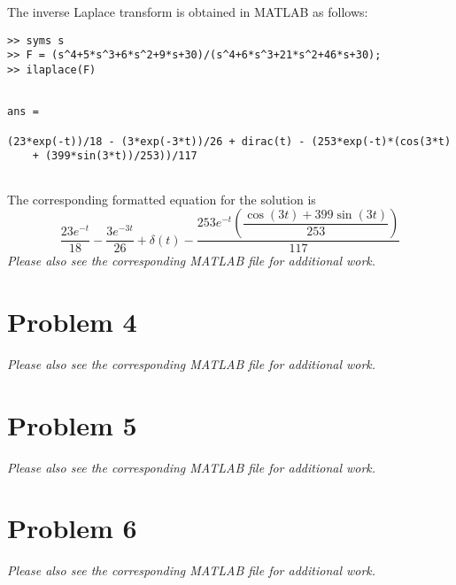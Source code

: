 \documentclass[letterpaper,10pt]{article}
\begin{document}
The inverse Laplace transform is obtained in MATLAB as follows:
\begin{verbatim}
>> syms s
>> F = (s^4+5*s^3+6*s^2+9*s+30)/(s^4+6*s^3+21*s^2+46*s+30);
>> ilaplace(F)
\end{verbatim}
\color{lightgray} \begin{verbatim}
 
ans =
 
(23*exp(-t))/18 - (3*exp(-3*t))/26 + dirac(t) - (253*exp(-t)*(cos(3*t) 
	+ (399*sin(3*t))/253))/117
 
\end{verbatim} \color{black}
The corresponding formatted equation for the solution is
\begin{equation}
	\frac{23e^{-t}}{18} 
	- \frac{3e^{-3t}}{26} 
	+ \delta(t) 
	- \dfrac{253e^{-t}\left(\dfrac{\cos(3t) + 399\sin(3t)}{253}\right)}{117}
\end{equation}
\emph{Please also see the corresponding MATLAB file for additional work.}

\section*{Problem 4}
\emph{Please also see the corresponding MATLAB file for additional work.}

\section*{Problem 5}
\emph{Please also see the corresponding MATLAB file for additional work.}

\section*{Problem 6}
\emph{Please also see the corresponding MATLAB file for additional work.}
\end{document}
